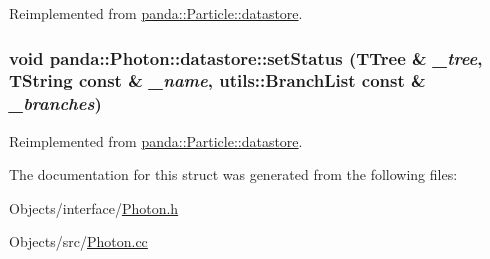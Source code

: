 Reimplemented from \hyperlink{structpanda_1_1Particle_1_1datastore_a3e4a1f8d223d8378ef2b92a6d4ccd2b0}{panda::Particle::datastore}.\hypertarget{structpanda_1_1Photon_1_1datastore_a809ca2b31f632a8503ee2dc839be55ed}{
\subsubsection[{setStatus}]{\setlength{\rightskip}{0pt plus 5cm}void panda::Photon::datastore::setStatus (TTree \& {\em \_\-tree}, \/  TString const \& {\em \_\-name}, \/  {\bf utils::BranchList} const \& {\em \_\-branches})}}
\label{structpanda_1_1Photon_1_1datastore_a809ca2b31f632a8503ee2dc839be55ed}


Reimplemented from \hyperlink{structpanda_1_1Particle_1_1datastore_a82fcd5398687827418d8bdcbfc16d661}{panda::Particle::datastore}.

The documentation for this struct was generated from the following files:\begin{DoxyCompactItemize}
\item 
Objects/interface/\hyperlink{Photon_8h}{Photon.h}\item 
Objects/src/\hyperlink{Photon_8cc}{Photon.cc}\end{DoxyCompactItemize}
